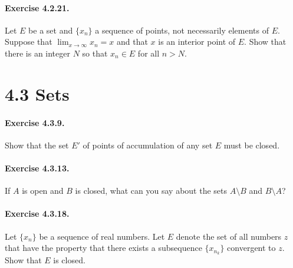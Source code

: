 \documentclass[11pt]{article}
\begin{document}
\paragraph{Exercise 4.2.21.} Let $E$ be a set and $\{x_n\}$ a sequence of points, not necessarily elements of $E$.
Suppose that $\lim_{x\rightarrow\infty} x_n = x$ and that $x$ is an interior point of $E$.
Show that there is an integer $N$ so that $x_n \in E$ for all $n > N$.

\section*{4.3 Sets}
\paragraph{Exercise 4.3.9.} Show that the set $E'$ of points of accumulation of any set $E$ must be closed.

\paragraph{Exercise 4.3.13.} If $A$ is open and $B$ is closed, what can you say about the sets $A \setminus B$ and $B \setminus A$?

\paragraph{Exercise 4.3.18.} Let $\{x_n\}$ be a sequence of real numbers.
Let $E$ denote the set of all numbers $z$ that have the property that there exists a subsequence $\{x_{n_k}\}$ convergent to $z$.
Show that $E$ is closed.
\end{document}
